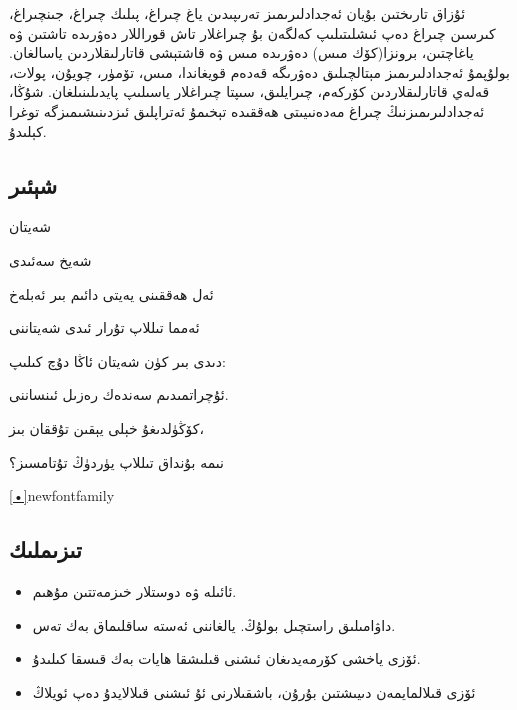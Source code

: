 \documentclass[24]{article}
\begin{document}
\begin{titlepage}
\begin{Arabic}
ئۇزاق تارىختىن بۇيان ئەجدادلىرىمىز تەرىپىدىن ياغ چىراغ، پىلىك چىراغ، جىنچىراغ، كىرسىن چىراغ دەپ ئىشلىتىلىپ كەلگەن بۇ چىراغلار تاش قوراللار دەۋرىدە تاشتىن ۋە ياغاچتىن، برونزا(كۆك مىس) دەۋرىدە مىس ۋە قاشتېشى قاتارلىقلاردىن ياسالغان. بولۇپمۇ ئەجدادلىرىمىز مېتالچىلىق دەۋرىگە قەدەم قويغاندا، مىس، تۆمۈر، چويۇن، پولات، قەلەي قاتارلىقلاردىن كۆركەم، چىرايلىق، سىپتا چىراغلار ياسىلىپ پايدىلىنىلغان. شۇڭا، ئەجدادلىرىمىزنىڭ چىراغ مەدەنىيىتى ھەققىدە تېخىمۇ ئەتراپلىق ئىزدىنىشىمىزگە توغرا كېلىدۇ.
\end{Arabic}

\renewfontfamily{}
\begin{Arabic}
\renewfontfamily{}
\section{\textarabic{شېئىر}}
\end{Arabic}



\renewfontfamily{}
\begin{Arabic}
\begin{center}
شەيتان

شەيخ سەئىدى
\end{center}

\hspace {1.3in}
    ئەل ھەققىنى  يەيتى دائىم بىر ئەبلەخ
 
 \hspace {1.3in}
ئەمما تىللاپ تۇرار ئىدى شەيتاننى

 \hspace {1.3in}
دىدى بىر كۈن شەيتان ئاڭا دۇچ كىلىپ:

 \hspace {1.3in}
ئۇچراتمىدىم سەندەك رەزىل ئىنساننى.

 \hspace {1.3in}
كۆڭۈلدىغۇ خېلى يېقىن تۇققان بىز،

\hspace {1.3in}
نىمە بۇنداق تىللاپ يۈردۈڭ تۇتامسىز؟

\end{Arabic}


\ref{•}newfontfamily
\begin{Arabic}
\renewfontfamily{}
\section{\textarabic{تىزىملىك}}
\end{Arabic}

\begin{Arabic}
\begin{itemize}
\item ئائىلە ۋە دوستلار خىزمەتتىن مۇھىم.
\item داۋامىلىق راستچىل بولۇڭ. يالغاننى ئەستە ساقلىماق بەك تەس.
\item ئۆزى ياخشى كۆرمەيدىغان ئىشنى قىلىشقا ھايات بەك قىسقا كىلىدۇ.
\item ئۆزى قىلالمايمەن دىيىشتىن بۇرۇن، باشقىلارنى ئۇ ئىشنى قىلالايدۇ دەپ ئويلاڭ
\end{itemize}
\end{Arabic}



\end{titlepage}
\end{document}
